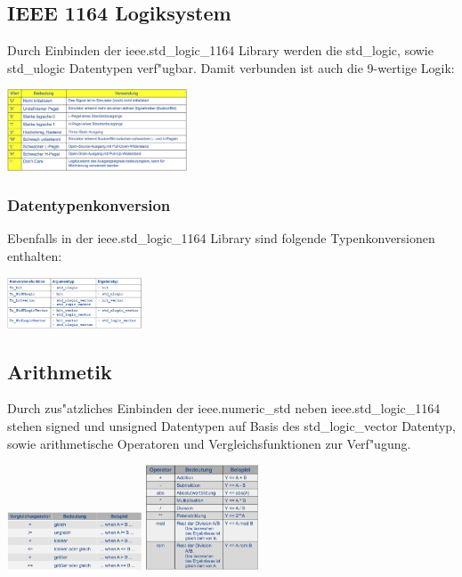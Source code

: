 	\begin{multicols}{2}
		\subsection{IEEE 1164 Logiksystem}
			Durch Einbinden der ieee.std\_logic\_1164 Library werden die std\_logic, sowie 
			std\_ulogic Datentypen verf"ugbar. Damit verbunden ist auch die 9-wertige Logik:
			\begin{center}
				\includegraphics[width=0.4\textwidth]{pics/ieee1164logicsystem}
			\end{center}
		\subsubsection{Datentypenkonversion}
			Ebenfalls in der ieee.std\_logic\_1164 Library sind folgende Typenkonversionen 
			enthalten:
			\begin{center}
				\includegraphics[width=0.3\textwidth]{pics/typeconversion}
			\end{center}
			
	\end{multicols}
	\subsection{Arithmetik}
		\begin{multicols}{2}
		Durch zus"atzliches Einbinden der ieee.numeric\_std neben ieee.std\_logic\_1164  	
		stehen signed und unsigned Datentypen auf Basis des std\_logic\_vector Datentyp, 
		sowie arithmetische Operatoren und Vergleichsfunktionen zur Verf"ugung.
		\begin{center}
			\includegraphics[width=0.3\textwidth]{pics/arithvergleich}
			\includegraphics[width=0.25\textwidth]{pics/arithoperator}
		\end{center}
	\end{multicols}

